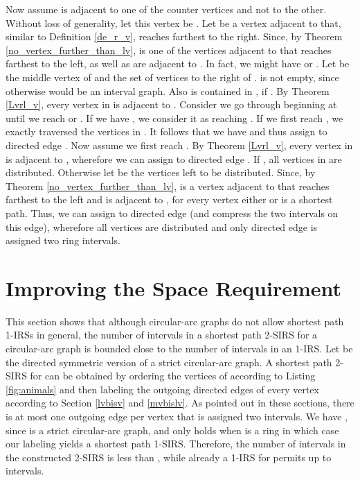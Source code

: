 \documentclass[10pt]{article}
\begin{document}
Now assume  is adjacent to one of the counter vertices and not to the other.
Without loss of generality, let this vertex be .
Let  be a vertex adjacent to  that, similar to Definition \ref{de_r_v}, reaches farthest to the right.
Since, by Theorem \ref{no_vertex_further_than_lv},  is one of the vertices 
adjacent to  that reaches farthest to the left,  as well as  are adjacent to .
In fact, we might have  or .
Let  be the middle vertex of  and  the set of vertices to the right of .
 is not empty, since otherwise  would be an interval graph.
Also  is contained in , if .
By Theorem \ref{Lvrl_v}, every vertex in  is adjacent to .
Consider we go through  beginning at  until we reach  or .
If we have , we consider it as reaching .
If we first reach , we exactly traversed the vertices in .
It follows that we have  and thus
assign  to directed edge .
Now assume we first reach . 
By Theorem \ref{Lvrl_v}, every vertex in  
is adjacent to , wherefore we can assign  to directed edge .
If , all vertices in  are distributed.
Otherwise let  be the vertices left to be distributed.
Since, by Theorem \ref{no_vertex_further_than_lv},  is a vertex adjacent to  
that reaches farthest to the left and  is adjacent to , 
for every vertex  either  or  is a shortest path.
Thus, we can assign  to directed edge  (and compress the two intervals on this edge),
wherefore all vertices are distributed and only directed edge  is assigned two ring intervals.

\section{Improving the Space Requirement}\label{improving}



This section shows that although circular-arc graphs do not allow shortest path 1-IRSs in general, 
the number of intervals in a shortest path 2-SIRS for a circular-arc graph is 
bounded close to the number of intervals in an 1-IRS.
Let  be the directed symmetric version of a strict circular-arc graph.
A shortest path 2-SIRS for  can be obtained by ordering the vertices of  
according to Listing \ref{fig:animals}
and then labeling the outgoing directed edges of every vertex according to 
Section \ref{lvbisv} and \ref{mvbislv}.
As pointed out in these sections, there is at most one outgoing edge per vertex that is assigned two intervals.
We have , since  is a strict circular-arc graph, and  only holds when  is a ring in which case our labeling yields a shortest path 1-SIRS.
Therefore, the number of intervals in the constructed 2-SIRS is less than , while already a 1-IRS for  permits up to  intervals.
\end{document}
